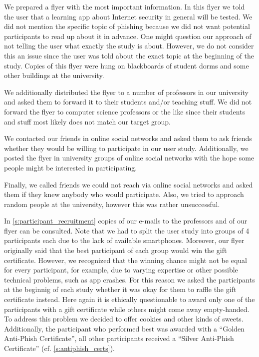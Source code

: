 \begin{description}[leftmargin=0cm]
\item[Flyer:]  We prepared a flyer with the most important information. 
In this flyer we told the user that a learning app about Internet security in general will be tested. 
We did not mention the specific topic of phishing because we did not want potential participants to read up about it in advance.
One might question our approach of not telling the user what exactly the study is about.
However, we do not consider this an issue since the user was told about the exact topic at the beginning of the study.
Copies of this flyer were hung on blackboards of student dorms and some other buildings at the university.
\item[E-Mail to Professors:] We additionally distributed the flyer to a number of professors in our university and asked them to forward it to their students and/or teaching stuff.
We did not forward the flyer to computer science professors or the like since their students and stuff most likely does not match our target group.
\item[Online Social Networks:] We contacted our friends in online social networks and asked them to ask friends whether they would be willing to participate in our user study.
Additionally, we posted the flyer in university groups of online social networks with the hope some people might be interested in participating.
\item[Further Networks:] Finally, we called friends we could not reach via online social networks and asked them if they knew anybody who would participate.
Also, we tried to approach random people at the university, however this was rather unsuccessful. 
\end{description}
In \autoref{s:participant_recruitment} copies of our e-mails to the professors and of our flyer can be consulted.
Note that we had to split the user study into groups of 4 participants each due to the lack of available smartphones.
Moreover, our flyer originally said that the best participant of each group would win the gift certificate.
However, we recognized that the winning chance might not be equal for every participant, for example, due to varying expertise or other possible technical problems, such as app crashes.
For this reason we asked the participants at the beginnig of each study whether it was okay for them to raffle the gift certificate instead.
Here again it is ethically questionable to award only one of the participants with a gift certificate while others might come away empty-handed.
To address this problem we decided to offer cookies and other kinds of sweets.
Additionally, the participant who performed best was awarded with a ``Golden Anti-Phish Certificate'', all other participants received a ``Silver Anti-Phish Certificate'' (cf. \autoref{s:antiphish_certs}).

